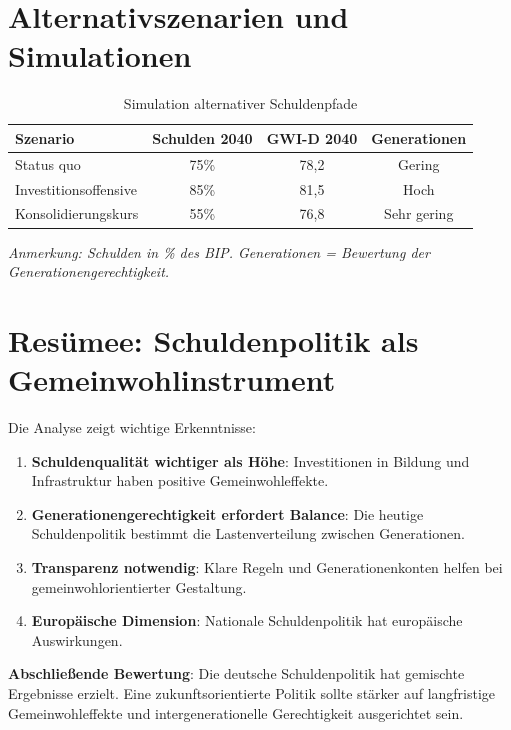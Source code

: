 \section{Alternativszenarien und Simulationen}

\begin{table}[ht]
    \centering
    \footnotesize
    \caption{Simulation alternativer Schuldenpfade}
    \label{tab:alternativszenarien}
    \begin{tabular}{@{}lccc@{}}
        \toprule
        \textbf{Szenario} & \textbf{Schulden 2040} & \textbf{GWI-D 2040} & \textbf{Generationen} \\
        \midrule
        Status quo & 75\% & 78,2 & Gering \\
        Investitionsoffensive & 85\% & 81,5 & Hoch \\
        Konsolidierungskurs & 55\% & 76,8 & Sehr gering \\
        \bottomrule
    \end{tabular}
\end{table}

\begin{flushleft}
\scriptsize{\textit{Anmerkung: Schulden in \% des BIP. Generationen = Bewertung der Generationengerechtigkeit.}}
\end{flushleft}

\section{Resümee: Schuldenpolitik als Gemeinwohlinstrument}

Die Analyse zeigt wichtige Erkenntnisse:

\begin{enumerate}
    \item \textbf{Schuldenqualität wichtiger als Höhe}: Investitionen in Bildung und Infrastruktur haben positive Gemeinwohleffekte.
    
    \item \textbf{Generationengerechtigkeit erfordert Balance}: Die heutige Schuldenpolitik bestimmt die Lastenverteilung zwischen Generationen.
    
    \item \textbf{Transparenz notwendig}: Klare Regeln und Generationenkonten helfen bei gemeinwohlorientierter Gestaltung.
    
    \item \textbf{Europäische Dimension}: Nationale Schuldenpolitik hat europäische Auswirkungen.
\end{enumerate}

\textbf{Abschließende Bewertung}: Die deutsche Schuldenpolitik hat gemischte Ergebnisse erzielt. Eine zukunftsorientierte Politik sollte stärker auf langfristige Gemeinwohleffekte und intergenerationelle Gerechtigkeit ausgerichtet sein.

\endinput